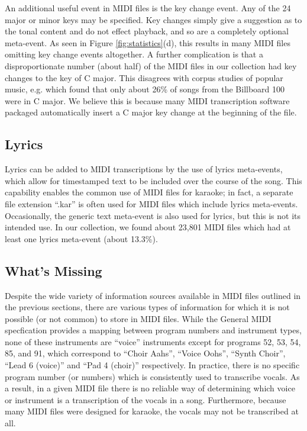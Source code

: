 \documentclass{article}
\begin{document}
An additional useful event in MIDI files is the key change event.
Any of the 24 major or minor keys may be specified.
Key changes simply give a suggestion as to the tonal content and do not effect playback, and so are a completely optional meta-event.
As seen in Figure \ref{fig:statistics}(d), this results in many MIDI files omitting key change events altogether.
A further complication is that a disproportionate number (about half) of the MIDI files in our collection had key changes to the key of C major.
This disagrees with corpus studies of popular music, e.g. \cite{carlton2012analyzed} which found that only about 26\% of songs from the Billboard 100 were in C major.
We believe this is because many MIDI transcription software packaged automatically insert a C major key change at the beginning of the file.

\subsection{Lyrics}

Lyrics can be added to MIDI transcriptions by the use of lyrics meta-events, which allow for timestamped text to be included over the course of the song.
This capability enables the common use of MIDI files for karaoke; in fact, a separate file extension ``.kar'' is often used for MIDI files which include lyrics meta-events.
Occasionally, the generic text meta-event is also used for lyrics, but this is not its intended use.
In our collection, we found about 23,801 MIDI files which had at least one lyrics meta-event (about 13.3\%).

\subsection{What's Missing}
\label{sec:missing}

Despite the wide variety of information sources available in MIDI files outlined in the previous sections, there are various types of information for which it is not possible (or not common) to store in MIDI files.
While the General MIDI specfication provides a mapping between program numbers and instrument types, none of these instruments are ``voice'' instruments except for programs 52, 53, 54, 85, and 91, which correspond to ``Choir Aahs'', ``Voice Oohs'', ``Synth Choir'', ``Lead 6 (voice)'' and ``Pad 4 (choir)'' respectively.
In practice, there is no specific program number (or numbers) which is consistently used to transcribe vocals.
As a result, in a given MIDI file there is no reliable way of determining which voice or instrument is a transcription of the vocals in a song.
Furthermore, because many MIDI files were designed for karaoke, the vocals may not be transcribed at all.
\end{document}
